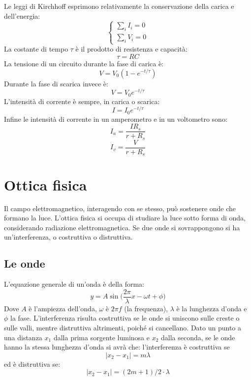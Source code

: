 \documentclass{article}
\begin{document}
Le leggi di Kirchhoff esprimono relativamente la conservazione della carica e dell'energia:
\begin{equation}
    \begin{cases}
        \sum_i I_i=0\\
        \sum_i V_i=0
    \end{cases}
\end{equation}
La costante di tempo $\tau$ è il prodotto di resistenza e capacità:
\begin{equation}
    \tau=RC
\end{equation}
La tensione di un circuito durante la fase di carica è:
\begin{equation}
    V=V_0(1-e^{-t/\tau})
\end{equation}
Durante la fase di scarica invece è:
\begin{equation}
    V=V_0e^{-t/\tau}
\end{equation}
L'intensità di corrente è sempre, in carica o scarica:
\begin{equation}
    I=I_0e^{-t/\tau}
\end{equation}
Infine le intensità di corrente in un amperometro e in un voltometro sono:
\begin{equation}
    I_a=\frac{I R_s}{r+R_s}
\end{equation}
\begin{equation}
    I_v=\frac{V}{r+R_s}
\end{equation}


\section{Ottica fisica}
Il campo elettromagnetico, interagendo con se stesso, può sostenere onde che formano la luce. L'ottica fisica si occupa di studiare la luce sotto forma di onda, considerando radiazione elettromagnetica. Se due onde si sovrappongono si ha un'interferenza, o costruttiva o distruttiva. 
\subsection{Le onde}
L'equazione generale di un'onda è della forma:
\begin{equation}
    y=A\sin{\bigg(\frac{2\pi}{\lambda}x-\omega t + \phi\bigg)}
\end{equation}
Dove $A$ è l'ampiezza dell'onda, $\omega$ è $2\pi f$ (la frequenza), $\lambda$ è la lunghezza d'onda e $\phi$ la fase.
L'interferenza risulta costruttiva se le onde si uniscono sulle creste o sulle valli, mentre distruttiva altrimenti, poiché si cancellano.
Dato un punto a una distanza $x_1$ dalla prima sorgente luminosa e $x_2$ dalla seconda, se le onde hanno la stessa lunghezza d'onda si avrà che:
l'interferenza è costruttiva se
\begin{equation}
    |x_2-x_1|=m\lambda
\end{equation}
ed è distruttiva se:
\begin{equation}
    |x_2-x_1|=(2m+1)/2 \cdot\lambda
\end{equation}
\end{document}
